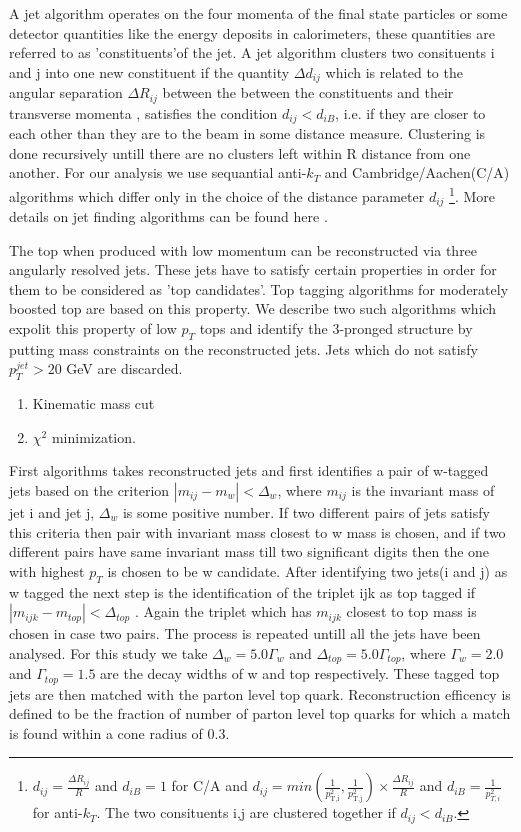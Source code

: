 \documentclass[12pt,a4paper]{article}		%
\begin{document}
	A jet algorithm operates on the four momenta of the final state particles or some detector quantities like the energy deposits in calorimeters, these quantities are referred to as 'constituents'of the jet. A jet algorithm clusters two consituents i and j into one new constituent if the quantity $\Delta d_{ij}$ which is related to the angular separation $\Delta R_{ij}$ between the  between the constituents and their transverse momenta , satisfies the condition $d_{ij} < d_{iB}$, i.e. if they are closer to each other than they are to the beam in some distance measure. Clustering is done recursively untill there are no clusters left within R distance from one another. For our analysis we use sequantial anti-$k_T$ and Cambridge/Aachen(C/A) algorithms which differ only in the choice of the distance parameter $d_{ij}$ \footnote{ $d_{ij} = \frac{\Delta R_{ij}}{R}$ and $d_{iB} = 1 $ for C/A and $d_{ij} = min \left( \frac{1}{p_{\text{T,i}}^2}, \frac{1}{p_{\text{T,j}}^2} \right)\times \frac{ \Delta R_{ij}}{R}$ and $ d_{iB} = \frac{1}{p_{T,i}^2} $ for anti-$k_T$. The two consituents i,j are clustered together if $d_{ij} < d_{iB}$.}. More details on jet finding algorithms can be found here \cite{jet-topography}.
	
	The top when produced with low momentum can be reconstructed via three angularly resolved jets. These jets have to satisfy certain properties in order for them to be considered as 'top candidates'. Top tagging algorithms for moderately boosted top are based on this property. We describe two such algorithms which expolit this property of low $p_T$ tops and identify the 3-pronged structure by putting mass constraints on the reconstructed jets. Jets which do not satisfy $p_T^{jet} > 20$ GeV are discarded.   
	\begin{enumerate}
		\item Kinematic mass cut
		\item $\chi^2$ minimization. 
	\end{enumerate}		
	 	
	 First algorithms takes reconstructed jets and first identifies a pair of w-tagged jets based on the criterion
	 $| m_{ij} - m_w | < \Delta_w$, where $m_{ij}$ is the invariant mass of jet i and jet j, $\Delta_w$ is some positive number. If two different pairs of jets satisfy this criteria then pair with invariant mass closest to w mass is chosen, and if two different pairs have same invariant mass till two significant digits then the one with highest $p_T$ is chosen to be w candidate. After identifying two jets(i and j) as w tagged the next step is the identification of the triplet ijk as top tagged if $|m_{ijk} -  m_{top}| < \Delta_{top}$ . Again the triplet which has $m_{ijk}$ closest to top mass is chosen in case two pairs. The process is repeated untill all the jets have been analysed. For this study we take $\Delta_w = 5.0\Gamma_w$ and $\Delta_{top} = 5.0\Gamma_{top}$, where $\Gamma_w = 2.0$ \cite{pdg-w} and $\Gamma_{top} = 1.5$\cite{pdg-top} are the decay widths of w and top respectively. These tagged top jets are then matched with the parton level top quark. Reconstruction efficency is defined to be the fraction of number of parton level top quarks for which a match is found within a cone radius of 0.3. 
	 
\end{document}
